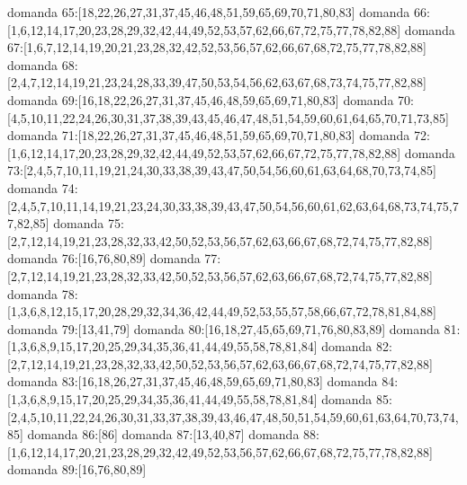 domanda 65:[18,22,26,27,31,37,45,46,48,51,59,65,69,70,71,80,83]
domanda 66:[1,6,12,14,17,20,23,28,29,32,42,44,49,52,53,57,62,66,67,72,75,77,78,82,88]
domanda 67:[1,6,7,12,14,19,20,21,23,28,32,42,52,53,56,57,62,66,67,68,72,75,77,78,82,88]
domanda 68:[2,4,7,12,14,19,21,23,24,28,33,39,47,50,53,54,56,62,63,67,68,73,74,75,77,82,88]
domanda 69:[16,18,22,26,27,31,37,45,46,48,59,65,69,71,80,83]
domanda 70:[4,5,10,11,22,24,26,30,31,37,38,39,43,45,46,47,48,51,54,59,60,61,64,65,70,71,73,85]
domanda 71:[18,22,26,27,31,37,45,46,48,51,59,65,69,70,71,80,83]
domanda 72:[1,6,12,14,17,20,23,28,29,32,42,44,49,52,53,57,62,66,67,72,75,77,78,82,88]
domanda 73:[2,4,5,7,10,11,19,21,24,30,33,38,39,43,47,50,54,56,60,61,63,64,68,70,73,74,85]
domanda 74:[2,4,5,7,10,11,14,19,21,23,24,30,33,38,39,43,47,50,54,56,60,61,62,63,64,68,73,74,75,77,82,85]
domanda 75:[2,7,12,14,19,21,23,28,32,33,42,50,52,53,56,57,62,63,66,67,68,72,74,75,77,82,88]
domanda 76:[16,76,80,89]
domanda 77:[2,7,12,14,19,21,23,28,32,33,42,50,52,53,56,57,62,63,66,67,68,72,74,75,77,82,88]
domanda 78:[1,3,6,8,12,15,17,20,28,29,32,34,36,42,44,49,52,53,55,57,58,66,67,72,78,81,84,88]
domanda 79:[13,41,79]
domanda 80:[16,18,27,45,65,69,71,76,80,83,89]
domanda 81:[1,3,6,8,9,15,17,20,25,29,34,35,36,41,44,49,55,58,78,81,84]
domanda 82:[2,7,12,14,19,21,23,28,32,33,42,50,52,53,56,57,62,63,66,67,68,72,74,75,77,82,88]
domanda 83:[16,18,26,27,31,37,45,46,48,59,65,69,71,80,83]
domanda 84:[1,3,6,8,9,15,17,20,25,29,34,35,36,41,44,49,55,58,78,81,84]
domanda 85:[2,4,5,10,11,22,24,26,30,31,33,37,38,39,43,46,47,48,50,51,54,59,60,61,63,64,70,73,74,85]
domanda 86:[86]
domanda 87:[13,40,87]
domanda 88:[1,6,12,14,17,20,21,23,28,29,32,42,49,52,53,56,57,62,66,67,68,72,75,77,78,82,88]
domanda 89:[16,76,80,89]


